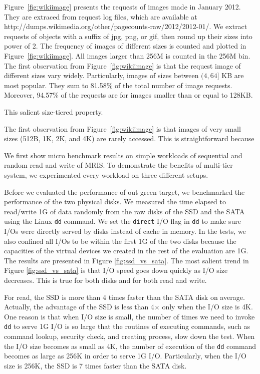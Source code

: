 Figure~\ref{fig:wikiimage} presents the requests of images made in
January 2012. They are extraced from request log files, which are
available at
http://dumps.wikimedia.org/other/pagecounts-raw/2012/2012-01/. We
extract requests of objects with a suffix of jpg, png, or gif, then
round up their sizes into power of 2. The frequency of images of
different sizes is counted and plotted in Figure~\ref{fig:wikiimage}.
All images larger than 256M is counted in the 256M bin. The first
observation from Figure~\ref{fig:wikiimage} is that the request image
of different sizes vary widely.  Particularly, images of sizes between
$(4, 64]$ KB are most popular. They sum to 81.58\% of the total number
of image requests. Moreover, 94.57\% of the requests are for images
smaller than or equal to 128KB.

This salient size-tiered property.


The first observation from Figure~\ref{fig:wikiimage} is that images of very
small sizes (512B, 1K, 2K, and 4K) are rarely accessed. This is
straightforward because 

We first show micro benchmark results on simple workloads of
sequential and random read and write of MRIS. To demonstrate the
benefits of multi-tier system, we experimented every workload on three
different setups. 

Before we evaluated the performance of out green target, we
benchmarked the performance of the two physical disks.  We measured
the time elapsed to read/write 1G of data randomly from the raw disks
of the SSD and the SATA using the Linux \texttt{dd} command. We set
the \texttt{direct} I/O flag in \texttt{dd} to make sure I/Os were
directly served by disks instead of cache in memory.  In the tests, we
also confined all I/Os to be within the first 1G of the two disks
because the capacities of the virtual devices we created in the rest
of the evaluation are 1G. The results are presented in Figure
\ref{fig:ssd_vs_sata}. The most salient trend in Figure
\ref{fig:ssd_vs_sata} is that I/O speed goes down quickly as I/O size
decreases. This is true for both disks and for both read and write. 

For read, the SSD is more than 4 times faster than the SATA disk on
average. Actually, the advantage of the SSD is less than 4$\times$
only when the I/O size is 4K.  One reason is that when I/O size is
small, the number of times we need to invoke \texttt{dd} to serve 1G
I/O is so large that the routines of executing commands, such as
command lookup, security check, and creating process, slow down the
test.  When the I/O size becomes as small as 4K, the number of
execution of the \texttt{dd} command becomes as large as 256K in order
to serve 1G I/O.  Particularly, when the I/O size is 256K, the SSD is
7 times faster than the SATA disk. 

